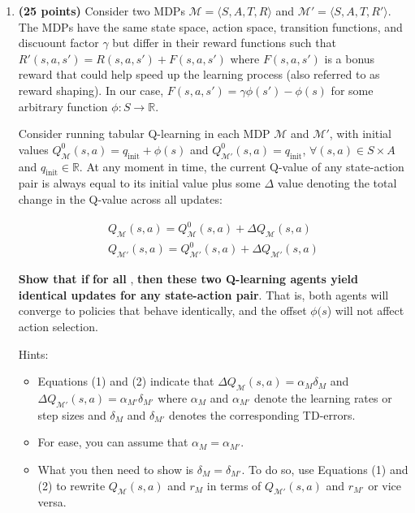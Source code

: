 \documentclass[11pt]{article}
\begin{document}
\begin{enumerate}
\item  \textbf{(25 points)}  Consider two MDPs $\mathcal{M}=\langle S,A,T,R\rangle $ and $\mathcal{M'}=\langle S,A,T,R'\rangle$. The MDPs have the same state space, action space, transition functions, and discuount factor $\gamma$ but differ in their reward functions such that $R'(s,a,s') = R(s,a,s') + F(s,a,s')$ where $F(s,a,s')$ is a bonus reward that could help speed up the learning process (also referred to as reward shaping). In our case, $F(s,a,s') = \gamma \phi(s') - \phi(s)$ for some arbitrary function $\phi:S \rightarrow \mathbb{R}$. 

Consider running tabular Q-learning in each MDP $\mathcal{M}$ and $\mathcal{M'}$, with initial values $Q^0_\mathcal{M}(s,a) = q_\text{init}+\phi(s)$ and  $Q^0_\mathcal{M'} (s,a)= q_\text{init}$, $\forall (s,a) \in S \times A$ and  $q_\text{init} \in \mathbb{R}$.  At any moment in time, the current Q-value of any state-action pair is always equal to its initial value plus some $\Delta$ value denoting the total change in the Q-value across all updates:
	
	\begin{align}
	Q_\mathcal{M} (s,a)= Q^0_\mathcal{M}(s,a) + \Delta Q_\mathcal{M} (s,a) \\
		Q_\mathcal{M'} (s,a)= Q^0_\mathcal{M'}(s,a) + \Delta Q_\mathcal{M'} (s,a)
\end{align}

	
	\textbf{Show that if}  \textbf{for all} , \textbf{then these two Q-learning agents yield identical updates for any state-action pair}. That is, both agents will converge to policies that behave identically, and the offset $\phi(s$) will not affect action selection. 
	
	Hints: 
	\begin{itemize}
		\item Equations (1) and (2) indicate that $\Delta Q_\mathcal{M} (s,a) = \alpha_M \delta_M$ and $\Delta Q_\mathcal{M'} (s,a) = \alpha_{M'} \delta_{M'}$  where $\alpha_M$ and $\alpha_{M'}$ denote the learning rates or step sizes and $\delta_M$ and $\delta_{M'}$ denotes the corresponding TD-errors. 
		\item  For ease, you can assume that $\alpha_M = \alpha_{M'}$.
		\item What you then need to show is $\delta_M = \delta_{M'}$. To do so, use Equations (1) and (2) to rewrite $Q_\mathcal{M} (s,a)$ and $r_M$ in terms of $Q_\mathcal{M'} (s,a)$ and $r_{M'}$ or vice versa. 
	\end{itemize}

	

	\end{enumerate}
	
	
\end{document}
